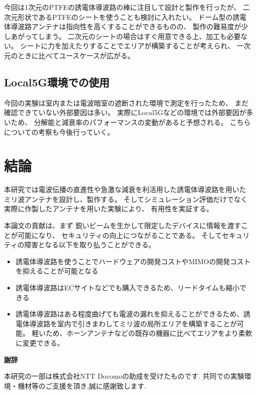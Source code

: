 \documentclass[technicalreport]{ieicej}
\begin{document}
今回は1次元のPTFEの誘電体導波路の棒に注目して設計と製作を行ったが、
二次元形状であるPTFEのシートを使うことも検討に入れたい。
ドーム型の誘電体導波路アンテナは指向性を高くすることができるものの、
製作の難易度が少しあがってしまう。
二次元のシートの場合はすぐ用意できる上、加工も必要ない。
シートに力を加えたりすることでエリアが構築することが考えられ、
一次元のときに比べてユースケースが広がる。

\subsection{Local5G環境での使用}

今回の実験は室内または電波暗室の遮断された環境で測定を行ったため、
まだ確認できていない外部要因は多い。
実際にLocal5Gなどの環境では外部要因が多いため、
分解能と減衰率のパフォーマンスの変動があると予想される。
こちらについての考察も今後行っていく。

\section{結論}

本研究では電波伝播の直進性や急激な減衰を利活用した誘電体導波路を用いた
ミリ波アンテナを設計し、製作する。
そしてシミュレーション評価だけでなく実際に作製したアンテナを用いた実験により、
有用性を実証する。

本論文の貢献は、まず
鋭いビームを生かして限定したデバイスに情報を渡すことが可能になり、
セキュリティの向上につながることである。
そしてセキュリティの障害となる以下を取り払うことができる。

\begin{itemize}
  \item 誘電体導波路を使うことでハードウェアの開発コストやMIMOの開発コストを抑えることが可能となる
  \item 誘電体導波路はECサイトなどでも購入できるため、リードタイムも縮小できる
  \item 誘電体導波路はある程度曲げても電波の漏れを抑えることができるため、誘電体導波路を室内で引きまわしてミリ波の局所エリアを構築することが可能。
  軽いため、ホーンアンテナなどの既存の機器に比べてエリアをより柔軟に変更できる。
\end{itemize}

\begin{center}
  \Large \textbf{謝辞}
\end{center}

本研究の一部は株式会社NTT Docomoの助成を受けたものです.
共同での実験環境・機材等のご支援を頂き,誠に感謝致します.

%
%

\end{document}
